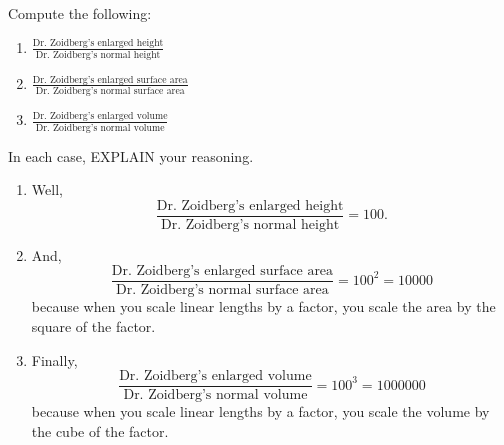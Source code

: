 \documentclass[handout,nooutcomes,noauthor]{ximera}
\begin{document}
 
\begin{question}
  Compute the following:
    \begin{enumerate}
    \item $\frac{\text{Dr.\ Zoidberg's enlarged
        height}}{\text{Dr.\ Zoidberg's normal height}}$
    \item $\frac{\text{Dr.\ Zoidberg's enlarged
        surface area}}{\text{Dr.\ Zoidberg's normal surface area}}$
    \item $\frac{\text{Dr.\ Zoidberg's enlarged
        volume}}{\text{Dr.\ Zoidberg's normal volume}}$
    \end{enumerate}
    In each case, EXPLAIN your reasoning.
    \begin{freeResponse}
      \begin{enumerate}
      \item Well,
        \[
        \frac{\text{Dr.\ Zoidberg's enlarged
            height}}{\text{Dr.\ Zoidberg's normal height}} = 100.
        \]
      \item And,
        \[
        \frac{\text{Dr.\ Zoidberg's enlarged
            surface area}}{\text{Dr.\ Zoidberg's normal surface area}} = 100^2 = 10000
        \]
        because when you scale linear lengths by a factor, you scale
        the area by the square of the factor.
      \item Finally,
        \[
        \frac{\text{Dr.\ Zoidberg's enlarged
            volume}}{\text{Dr.\ Zoidberg's normal volume}} = 100^3 = 1000000
        \]
        because when you scale linear lengths by a factor, you scale
        the volume by the cube of the factor.
      \end{enumerate}
    \end{freeResponse}
\end{question}
\mynewpage
\end{document}
